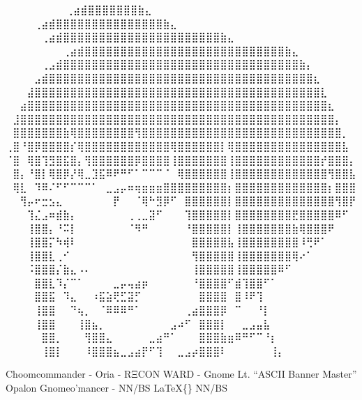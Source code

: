 \documentclass[
]{article}
\begin{document}
⠀⠀⠀⠀⠀⠀ ⠀⠀⢀⣴⣾⣿⣿⣿⣿⣿⣿⣿⣷⣄⠀⠀⠀⠀⠀⠀⠀⠀ ⠀⠀⠀ ⠀ ⠀⠀⠀⠀⢀⣴⣾⣿⣿⣿⣿⣿⣿⣿⣿⣿⣿⣿⣿⣿⣿⣿⣷⣄⠀⠀⠀⠀⠀⠀⠀⠀ ⠀⠀
⠀ ⠀⠀⠀⠀⠀⢀⣴⣾⣿⣿⣿⣿⣿⣿⣿⣿⣿⣿⣿⣿⣿⣿⣿⣿⣿⣿⣿⣿⣿⣿⣷⣄⠀⠀⠀⠀⠀⠀⠀⠀
⠀⠀⠀⠀⠀⠀⠀⠀⢀⣴⣾⣿⣿⣿⣿⣿⣿⣿⣿⣿⣿⣿⣿⣿⣿⣿⣿⣿⣿⣿⣿⣿⣿⣿⣿⣿⣿⣿⣿⣷⣄⠀⠀⠀⠀⠀⠀⠀⠀
⠀⠀⠀⠀⠀⢀⣠⣾⣿⣿⣿⣿⣿⣿⣿⣿⣿⣿⣿⣿⣿⣿⣿⣿⣿⣿⣿⣿⣿⣿⣿⣿⣿⣿⣿⣿⣿⣿⣿⣿⣿⣷⡄⠀⠀⠀⠀⠀⠀
⠀⠀⠀⠀⣠⣾⣿⣿⣿⣿⣿⣿⣿⣿⣿⣿⣿⣿⣿⣿⣿⣿⣿⣿⣿⣿⣿⣿⣿⣿⣿⣿⣿⣿⣿⣿⣿⣿⣿⣿⣿⣿⣿⣆⠀⠀⠀⠀⠀
⠀⠀⠀⣼⣿⣿⣿⣿⣿⣿⣿⣿⣿⣿⣿⣿⣿⣿⣿⣿⣿⣿⣿⣿⣿⣿⣿⣿⣿⣿⣿⣿⣿⣿⣿⣿⣿⣿⣿⣿⣿⣿⣿⣿⣇⠀⠀⠀⠀
⠀⠀⣴⣿⣿⣿⣿⣿⣿⣿⣿⣿⣿⣿⣿⣿⣿⣿⣿⣿⣿⣿⣿⣿⣿⣿⣿⣿⣿⣿⣿⣿⣿⣿⣿⣿⣿⣿⣿⣿⣿⣿⣿⣿⣿⣆⠀⠀⠀
⠀⣸⣿⣿⣿⣿⣿⣿⣿⣿⣿⣿⣿⣿⣿⣿⣿⣿⣿⣿⣿⣿⣿⣿⣿⣿⣿⣿⣿⣿⣿⣿⣿⣿⣿⣿⣿⣿⣿⣿⣿⣿⣿⣿⣿⣿⡄⠀⠀
⠀⣿⣿⣿⣿⣿⣿⣿⣷⢿⣿⣿⣿⣿⣿⣿⣿⣿⢻⣿⣿⣿⣿⣿⣿⣿⣿⣿⣿⣿⣿⣿⣿⣿⣿⣿⣿⣿⣿⣿⣿⣿⣿⣿⣿⣿⣿⡀⠀
⢀⣿⠘⣿⡿⣿⣿⣿⣿⡎⢿⣿⣿⣿⣿⣿⣿⣿⣿⣿⣿⣿⣿⢿⣿⣿⣿⣿⣿⣿⡇⢿⣿⣿⣿⣿⣿⣿⣿⣿⣿⣿⣿⣿⣿⣿⣿⣧⠀
⠈⣿⠀⢿⣿⢹⣻⣿⣯⣿⡄⢻⣿⣿⣿⣿⣿⣿⡿⣿⣿⣿⣿⢸⣿⣿⣿⣿⣿⣿⣿⢸⣿⣿⣿⣿⣿⣿⣿⣿⣿⣿⣿⣿⡞⣿⣿⣿⡄
⠀⣿⡄⠘⣿⡇⢿⣿⡿⡜⢿⣀⣹⣯⠿⠟⠛⠋⠁⠉⠉⠉⠈⠀⢿⣿⣿⣿⣿⣿⣿⢸⣿⣿⣿⣿⣿⣿⣿⣿⣿⣿⣿⣿⣿⢻⣿⣿⣧
⠀⢿⣇⠀⠹⠿⠌⠋⠋⠉⠉⠉⠁⠀⣀⣠⡤⠶⢶⣶⣶⣶⣿⣿⣿⣿⣿⣿⣿⣿⣿⡆⣿⣿⣿⣿⣿⣿⣿⣿⣿⣿⣿⣿⣿⡆⣿⣿⣿
⠀⠀⢻⡤⠖⣒⣢⣄⠀⠀⠀⠀⠀⠀⠀⡟⠀⠀⠈⢿⠓⣻⡿⠋⠀⣿⣿⣿⣿⣿⣿⡇⣿⣿⣿⣿⣿⣿⣿⣿⣿⣿⣿⣿⣿⣿⢻⣿⡟
⠀⠀⠀⢹⣌⣠⠶⣾⣷⡄⠀⠀⠀⠀⠀⠀⠀⢀⢀⣀⣽⠋⠀⠀⠀⢹⣿⣿⣿⣿⣿⡇⣿⣿⣿⣿⣿⣿⣿⣿⣟⣿⣿⣿⣿⣿⠿⠋⠀
⠀⠀⠀⢸⣿⣿⡄⠘⠭⡇⠀⠀⠀⠀⠀⠀⠀⠈⠻⠛⠀⠀⠀⠀⠀⠘⣿⣿⣿⣿⣿⡇⢸⣿⣿⣿⣿⣿⣿⣿⣷⢿⣿⣿⣿⠟⠀⠀⠀
⠀⠀⠀⢸⣿⣿⡍⠳⢾⠇⠀⠀⠀⠀⠀⠀⠀⠀⠀⠀⠀⠀⠀⠀⠀⠀⣿⣿⣿⣿⣿⣧⢸⣿⣿⣿⣿⣿⣿⣿⣿⠸⢛⠟⠁⠀⠀⠀⠀
⠀⠀⠀⢸⣿⣿⣇⢀⠊⠀⠀⠀⠀⠀⠀⠀⠀⠀⠀⠀⠀⠀⠀⠀⠀⠀⢻⣿⣿⣿⣿⣿⢸⣿⣿⣿⣿⣿⣿⣿⢿⠔⠁⠀⠀⠀⠀⠀⠀
⠀⠀⠀⠨⣿⣿⣿⡌⣷⣄⠠⠄⠀⠀⠀⠀⠀⠀⠀⠀⠀⠀⠀⠀⠀⠀⢸⣿⣿⣿⣿⣿⢸⣿⣿⣿⣿⣿⠿⠋⠀⠀⠀⠀⠀⠀⠀⠀⠀
⠀⠀⠀⠀⣿⣿⣇⠹⡌⠉⠁⠀⠀⠀⠀⣀⡤⢤⣴⡶⠀⠀⠀⠀⠀⠀⠘⣿⣿⣿⣿⠋⣾⢹⣿⣿⠋⠁⠀⠀⠀⠀⠀⠀⠀⠀⠀⠀⠀
⠀⠀⠀⠀⣿⣿⣯⠀⠹⣄⠀⠀⠰⣯⣵⢟⣋⣽⡋⠀⠀⠀⠀⠀⠀⠀⠀⣿⣿⣿⣿⠀⣿⠸⠟⢹⠀⠀⠀⠀⠀⠀⠀⠀⠀⠀⠀⠀⠀
⠀⠀⠀⠀⢸⣿⣿⠀⠀⠙⢦⡀⠀⠈⠿⠿⠿⠛⠁⠀⠀⠀⠀⠀⠀⢀⣴⣿⣿⣿⡿⠀⠉⠀⠀⠘⡇⠀⠀⠀⠀⠀⠀⠀⠀⠀⠀⠀⠀
⠀⠀⠀⠀⢸⣿⣿⠀⠀⠀⢸⣿⣦⡀⠀⠀⠀⠀⠀⠀⠀⠀⠀⣠⠴⠋⠀⣿⣿⣿⡇⠀⠀⣀⣠⣤⣧⠀⠀⠀⠀⠀⠀⠀⠀⠀⠀⠀⠀
⠀⠀⠀⠀⠀⣿⣿⡀⠀⠀⠀⢻⣿⣿⣄⠀⠀⠀⠀⠀⣀⣴⠛⠁⠀⠀⠀⣿⣿⣿⣷⣶⠿⠛⠋⠉⠘⡆⠀⠀⠀⠀⠀⠀⠀⠀⠀⠀⠀
⠀⠀⠀⠀⠀⢸⣿⡇⠀⠀⠀⠸⣿⣿⣿⣦⣀⣠⣴⡟⠋⢹⠀⠀⣀⣠⡴⣿⣿⣿⠇⠀⠀⠀⠀⠀⠀⢸⡄⠀⠀⠀⠀⠀⠀⠀⠀⠀⠀

Choomcommander - Oria - RΞCON WARD - Gnome Lt. ``ASCII Banner Master''
Opalon Gnomeo'mancer - NN/BS LaTeX\{\} NN/BS
\end{document}
